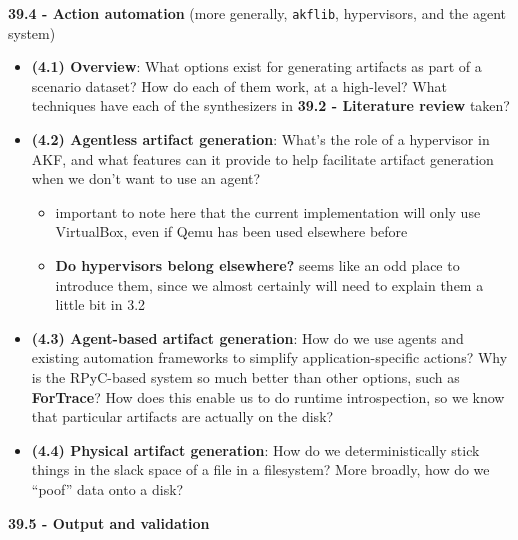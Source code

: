 \textbf{39.4 - Action automation} (more generally, \texttt{akflib},
hypervisors, and the agent system)

\begin{itemize}
\tightlist
\item
  \textbf{(4.1) Overview}: What options exist for generating artifacts
  as part of a scenario dataset? How do each of them work, at a
  high-level? What techniques have each of the synthesizers in
  \textbf{39.2 - Literature review} taken?
\item
  \textbf{(4.2) Agentless artifact generation}: What's the role of a
  hypervisor in AKF, and what features can it provide to help facilitate
  artifact generation when we don't want to use an agent?

  \begin{itemize}
  \tightlist
  \item
    important to note here that the current implementation will only use
    VirtualBox, even if Qemu has been used elsewhere before
  \item
    \textbf{Do hypervisors belong elsewhere?} seems like an odd place to
    introduce them, since we almost certainly will need to explain them
    a little bit in 3.2
  \end{itemize}
\item
  \textbf{(4.3) Agent-based artifact generation}: How do we use agents
  and existing automation frameworks to simplify application-specific
  actions? Why is the RPyC-based system so much better than other
  options, such as \textbf{ForTrace}? How does this enable us to do
  runtime introspection, so we know that particular artifacts are
  actually on the disk?
\item
  \textbf{(4.4) Physical artifact generation}: How do we
  deterministically stick things in the slack space of a file in a
  filesystem? More broadly, how do we ``poof'' data onto a disk?
\end{itemize}

\textbf{39.5 - Output and validation}

